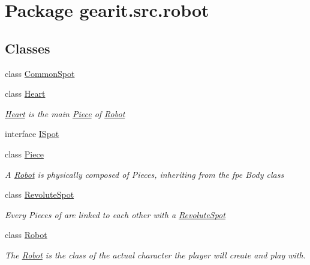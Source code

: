 \hypertarget{namespacegearit_1_1src_1_1robot}{\section{Package gearit.\+src.\+robot}
\label{namespacegearit_1_1src_1_1robot}
}
\subsection*{Classes}
\begin{DoxyCompactItemize}
\item 
class \hyperlink{classgearit_1_1src_1_1robot_1_1_common_spot}{Common\+Spot}
\item 
class \hyperlink{classgearit_1_1src_1_1robot_1_1_heart}{Heart}
\begin{DoxyCompactList}\small\item\em \hyperlink{classgearit_1_1src_1_1robot_1_1_heart}{Heart} is the main \hyperlink{classgearit_1_1src_1_1robot_1_1_piece}{Piece} of \hyperlink{classgearit_1_1src_1_1robot_1_1_robot}{Robot} \end{DoxyCompactList}\item 
interface \hyperlink{interfacegearit_1_1src_1_1robot_1_1_i_spot}{I\+Spot}
\item 
class \hyperlink{classgearit_1_1src_1_1robot_1_1_piece}{Piece}
\begin{DoxyCompactList}\small\item\em A \hyperlink{classgearit_1_1src_1_1robot_1_1_robot}{Robot} is physically composed of Pieces, inheriting from the fpe Body class \end{DoxyCompactList}\item 
class \hyperlink{classgearit_1_1src_1_1robot_1_1_revolute_spot}{Revolute\+Spot}
\begin{DoxyCompactList}\small\item\em Every Pieces of are linked to each other with a \hyperlink{classgearit_1_1src_1_1robot_1_1_revolute_spot}{Revolute\+Spot} \end{DoxyCompactList}\item 
class \hyperlink{classgearit_1_1src_1_1robot_1_1_robot}{Robot}
\begin{DoxyCompactList}\small\item\em The \hyperlink{classgearit_1_1src_1_1robot_1_1_robot}{Robot} is the class of the actual character the player will create and play with. \end{DoxyCompactList}\item 

\end{DoxyCompactItemize}
